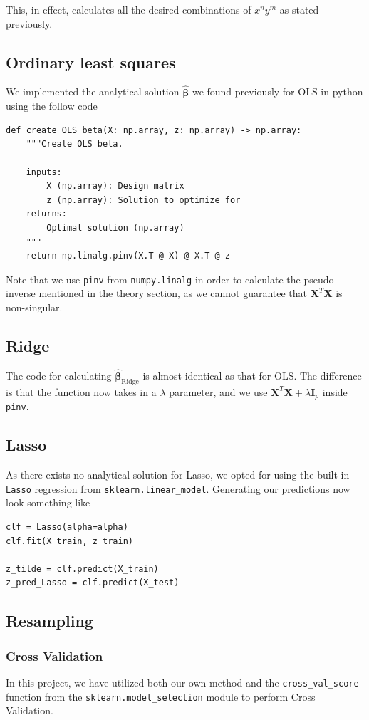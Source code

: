 \documentclass{article}
\begin{document}
This, in effect, calculates all the desired combinations of $x^n y^m$ as stated previously.


\subsection{Ordinary least squares}
We implemented the analytical solution $\boldsymbol{\hat{\beta}}$ we found previously for OLS in python using the follow code
\begin{verbatim}
def create_OLS_beta(X: np.array, z: np.array) -> np.array:
    """Create OLS beta.

    inputs:
        X (np.array): Design matrix
        z (np.array): Solution to optimize for
    returns:
        Optimal solution (np.array)
    """
    return np.linalg.pinv(X.T @ X) @ X.T @ z
\end{verbatim}

Note that we use \verb|pinv| from \verb|numpy.linalg| in order to calculate the pseudo-inverse mentioned in the theory section, as we cannot guarantee that $\textbf{X}^T \textbf{X}$ is non-singular.

\subsection{Ridge}
The code for calculating $\boldsymbol{\hat{\beta}}_\text{Ridge}$ is almost identical as that for OLS. The difference is that the function now takes in a $\lambda$ parameter, and we use $\textbf{X}^T \textbf{X} + \lambda \boldsymbol{I}_p$ inside \verb|pinv|.

\subsection{Lasso}
As there exists no analytical solution for Lasso, we opted for using the built-in \verb|Lasso| regression from \verb|sklearn.linear_model|. Generating our predictions now look something like
\begin{verbatim}
clf = Lasso(alpha=alpha)
clf.fit(X_train, z_train)

z_tilde = clf.predict(X_train)
z_pred_Lasso = clf.predict(X_test)
\end{verbatim}
\subsection{Resampling}
\subsubsection{Cross Validation}
 In this project, we have utilized both our own method and the \verb|cross_val_score| function from the \verb|sklearn.model_selection| module to perform Cross Validation.
 
\end{document}
